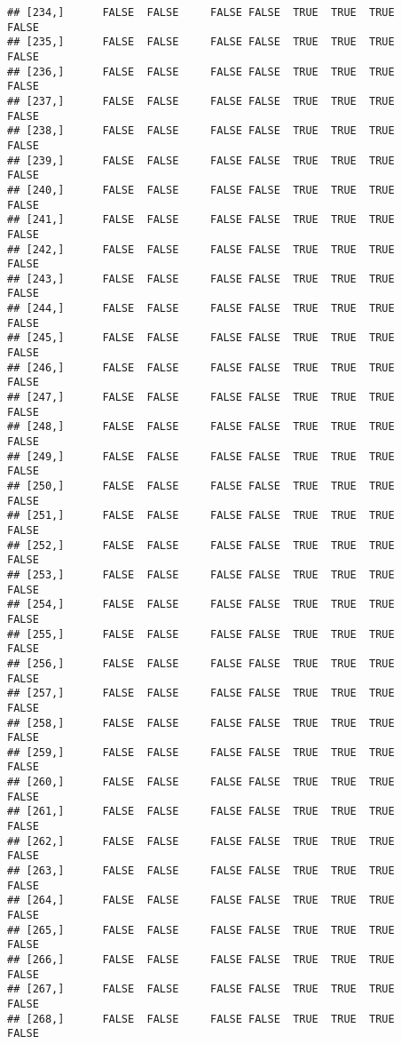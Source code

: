 \documentclass[
]{article}
\begin{document}
\begin{verbatim}
## [234,]      FALSE  FALSE     FALSE FALSE  TRUE  TRUE  TRUE         FALSE
## [235,]      FALSE  FALSE     FALSE FALSE  TRUE  TRUE  TRUE         FALSE
## [236,]      FALSE  FALSE     FALSE FALSE  TRUE  TRUE  TRUE         FALSE
## [237,]      FALSE  FALSE     FALSE FALSE  TRUE  TRUE  TRUE         FALSE
## [238,]      FALSE  FALSE     FALSE FALSE  TRUE  TRUE  TRUE         FALSE
## [239,]      FALSE  FALSE     FALSE FALSE  TRUE  TRUE  TRUE         FALSE
## [240,]      FALSE  FALSE     FALSE FALSE  TRUE  TRUE  TRUE         FALSE
## [241,]      FALSE  FALSE     FALSE FALSE  TRUE  TRUE  TRUE         FALSE
## [242,]      FALSE  FALSE     FALSE FALSE  TRUE  TRUE  TRUE         FALSE
## [243,]      FALSE  FALSE     FALSE FALSE  TRUE  TRUE  TRUE         FALSE
## [244,]      FALSE  FALSE     FALSE FALSE  TRUE  TRUE  TRUE         FALSE
## [245,]      FALSE  FALSE     FALSE FALSE  TRUE  TRUE  TRUE         FALSE
## [246,]      FALSE  FALSE     FALSE FALSE  TRUE  TRUE  TRUE         FALSE
## [247,]      FALSE  FALSE     FALSE FALSE  TRUE  TRUE  TRUE         FALSE
## [248,]      FALSE  FALSE     FALSE FALSE  TRUE  TRUE  TRUE         FALSE
## [249,]      FALSE  FALSE     FALSE FALSE  TRUE  TRUE  TRUE         FALSE
## [250,]      FALSE  FALSE     FALSE FALSE  TRUE  TRUE  TRUE         FALSE
## [251,]      FALSE  FALSE     FALSE FALSE  TRUE  TRUE  TRUE         FALSE
## [252,]      FALSE  FALSE     FALSE FALSE  TRUE  TRUE  TRUE         FALSE
## [253,]      FALSE  FALSE     FALSE FALSE  TRUE  TRUE  TRUE         FALSE
## [254,]      FALSE  FALSE     FALSE FALSE  TRUE  TRUE  TRUE         FALSE
## [255,]      FALSE  FALSE     FALSE FALSE  TRUE  TRUE  TRUE         FALSE
## [256,]      FALSE  FALSE     FALSE FALSE  TRUE  TRUE  TRUE         FALSE
## [257,]      FALSE  FALSE     FALSE FALSE  TRUE  TRUE  TRUE         FALSE
## [258,]      FALSE  FALSE     FALSE FALSE  TRUE  TRUE  TRUE         FALSE
## [259,]      FALSE  FALSE     FALSE FALSE  TRUE  TRUE  TRUE         FALSE
## [260,]      FALSE  FALSE     FALSE FALSE  TRUE  TRUE  TRUE         FALSE
## [261,]      FALSE  FALSE     FALSE FALSE  TRUE  TRUE  TRUE         FALSE
## [262,]      FALSE  FALSE     FALSE FALSE  TRUE  TRUE  TRUE         FALSE
## [263,]      FALSE  FALSE     FALSE FALSE  TRUE  TRUE  TRUE         FALSE
## [264,]      FALSE  FALSE     FALSE FALSE  TRUE  TRUE  TRUE         FALSE
## [265,]      FALSE  FALSE     FALSE FALSE  TRUE  TRUE  TRUE         FALSE
## [266,]      FALSE  FALSE     FALSE FALSE  TRUE  TRUE  TRUE         FALSE
## [267,]      FALSE  FALSE     FALSE FALSE  TRUE  TRUE  TRUE         FALSE
## [268,]      FALSE  FALSE     FALSE FALSE  TRUE  TRUE  TRUE         FALSE

\end{verbatim}
\end{document}
